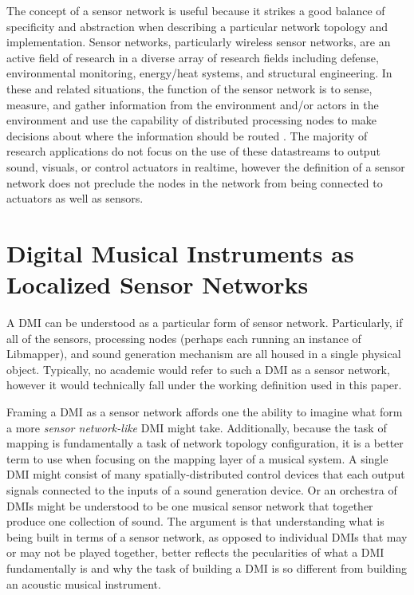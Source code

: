 The concept of a sensor network is useful because it strikes a good balance of specificity and abstraction when describing a particular network topology and implementation. Sensor networks, particularly wireless sensor networks, are an active field of research in a diverse array of research fields including defense, environmental monitoring, energy/heat systems, and structural engineering. In these and related situations, the function of the sensor network is to sense, measure, and gather information from the environment and/or actors in the environment and use the capability of distributed processing nodes to make decisions about where the information should be routed \cite{survey2008}. The majority of research applications do not focus on the use of these datastreams to output sound, visuals, or control actuators in realtime, however the definition of a sensor network does not preclude the nodes in the network from being connected to actuators as well as sensors.

\section{Digital Musical Instruments as Localized Sensor Networks}

A DMI can be understood as a particular form of sensor network. Particularly, if all of the sensors, processing nodes (perhaps each running an instance of Libmapper), and sound generation mechanism are all housed in a single physical object. Typically, no academic would refer to such a DMI as a sensor network, however it would technically fall under the working definition used in this paper.

Framing a DMI as a sensor network affords one the ability to imagine what form a more \emph{sensor network-like} DMI might take. Additionally, because the task of mapping is fundamentally a task of network topology configuration, it is a better term to use when focusing on the mapping layer of a musical system. A single DMI might consist of many spatially-distributed control devices that each output signals connected to the inputs of a sound generation device. Or an orchestra of DMIs might be understood to be one musical sensor network that together produce one collection of sound. The argument is that understanding what is being built in terms of a sensor network, as opposed to individual DMIs that may or may not be played together, better reflects the pecularities of what a DMI fundamentally is and why the task of building a DMI is so different from building an acoustic musical instrument.

